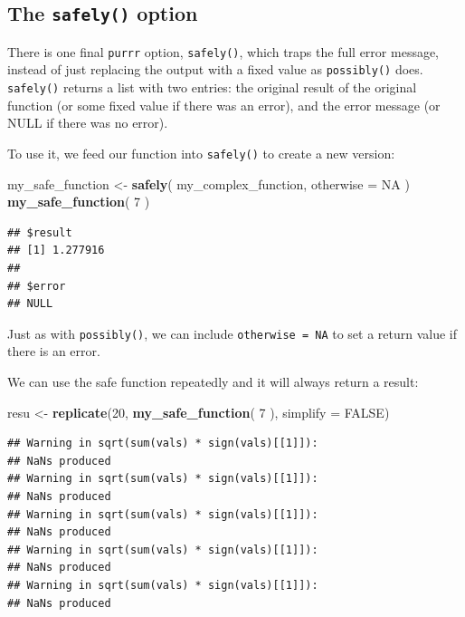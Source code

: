 \documentclass[
]{book}
\newenvironment{Shaded}{\begin{snugshade}}{\end{snugshade}}
\newcommand{\AttributeTok}[1]{\textcolor[rgb]{0.13,0.29,0.53}{#1}}
\newcommand{\ConstantTok}[1]{\textcolor[rgb]{0.56,0.35,0.01}{#1}}
\newcommand{\DecValTok}[1]{\textcolor[rgb]{0.00,0.00,0.81}{#1}}
\newcommand{\FunctionTok}[1]{\textcolor[rgb]{0.13,0.29,0.53}{\textbf{#1}}}
\newcommand{\NormalTok}[1]{#1}
\newcommand{\OtherTok}[1]{\textcolor[rgb]{0.56,0.35,0.01}{#1}}
\begin{document}
\subsection{\texorpdfstring{The \texttt{safely()} option}{The safely() option}}\label{the-safely-option}

There is one final \texttt{purrr} option, \texttt{safely()}, which traps the full error message, instead of just replacing the output with a fixed value as \texttt{possibly()} does.
\texttt{safely()} returns a list with two entries: the original result of the original function (or some fixed value if there was an error), and the error message (or NULL if there was no error).

To use it, we feed our function into \texttt{safely()} to create a new version:

\begin{Shaded}
\begin{Highlighting}[]
\NormalTok{my\_safe\_function }\OtherTok{\textless{}{-}} \FunctionTok{safely}\NormalTok{( my\_complex\_function, }\AttributeTok{otherwise =} \ConstantTok{NA}\NormalTok{ )}
\FunctionTok{my\_safe\_function}\NormalTok{( }\DecValTok{7}\NormalTok{ )}
\end{Highlighting}
\end{Shaded}

\begin{verbatim}
## $result
## [1] 1.277916
## 
## $error
## NULL
\end{verbatim}

Just as with \texttt{possibly()}, we can include \texttt{otherwise\ =\ NA} to set a return value if there is an error.

We can use the safe function repeatedly and it will always return a result:

\begin{Shaded}
\begin{Highlighting}[]
\NormalTok{resu }\OtherTok{\textless{}{-}} \FunctionTok{replicate}\NormalTok{(}\DecValTok{20}\NormalTok{, }\FunctionTok{my\_safe\_function}\NormalTok{( }\DecValTok{7}\NormalTok{ ), }\AttributeTok{simplify =} \ConstantTok{FALSE}\NormalTok{)}
\end{Highlighting}
\end{Shaded}

\begin{verbatim}
## Warning in sqrt(sum(vals) * sign(vals)[[1]]):
## NaNs produced
## Warning in sqrt(sum(vals) * sign(vals)[[1]]):
## NaNs produced
## Warning in sqrt(sum(vals) * sign(vals)[[1]]):
## NaNs produced
## Warning in sqrt(sum(vals) * sign(vals)[[1]]):
## NaNs produced
## Warning in sqrt(sum(vals) * sign(vals)[[1]]):
## NaNs produced
\end{verbatim}
\end{document}
